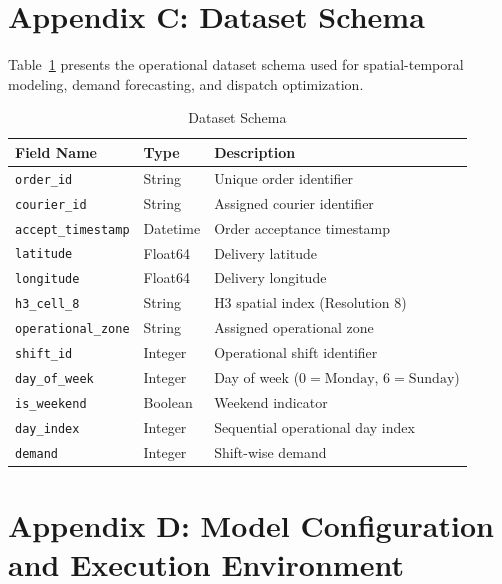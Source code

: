 \documentclass{article}
\begin{document}
\section*{Appendix C: Dataset Schema}

Table~\ref{tab:dataset_schema} presents the operational dataset schema used for spatial-temporal modeling, demand forecasting, and dispatch optimization.

\begin{table}[H]
\centering
\caption{Dataset Schema}
\label{tab:dataset_schema}
\small
\begin{tabularx}{\textwidth}{l l X}
\hline
\textbf{Field Name} & \textbf{Type} & \textbf{Description} \\
\hline
\texttt{order\_id} & String & Unique order identifier \\
\texttt{courier\_id} & String & Assigned courier identifier \\
\texttt{accept\_timestamp} & Datetime & Order acceptance timestamp \\
\texttt{latitude} & Float64 & Delivery latitude \\
\texttt{longitude} & Float64 & Delivery longitude \\
\texttt{h3\_cell\_8} & String & H3 spatial index (Resolution 8) \\
\texttt{operational\_zone} & String & Assigned operational zone \\
\texttt{shift\_id} & Integer & Operational shift identifier \\
\texttt{day\_of\_week} & Integer & Day of week ($0 = \text{Monday}$, $6 = \text{Sunday}$) \\
\texttt{is\_weekend} & Boolean & Weekend indicator \\
\texttt{day\_index} & Integer & Sequential operational day index \\
\texttt{demand} & Integer & Shift-wise demand \\
\hline
\end{tabularx}
\end{table}

\section*{Appendix D: Model Configuration and Execution Environment}
\label{app:model_configuration}
\end{document}
